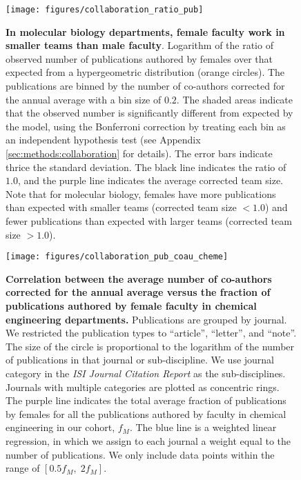 \clearpage

\begin{figure}[t]
\texttt{[image: figures/collaboration\_ratio\_pub]}
\caption[Ratio of number of publications authored by females.]{\textbf{In molecular biology departments, female faculty work in smaller teams than male faculty}. Logarithm of the ratio of observed number of publications authored by females over that expected from a hypergeometric distribution (orange circles). The publications are binned by the number of co-authors corrected for the annual average with a bin size of $0.2$. The shaded areas indicate that the observed number is significantly different from expected by the model, using the Bonferroni correction by treating each bin as an independent hypothesis test (see Appendix \ref{sec:methods:collaboration} for details). The error bars indicate thrice the standard deviation. The black line indicates the ratio of $1.0$, and the purple line indicates the average corrected team size. Note that for molecular biology, females have more publications than expected with smaller teams (corrected team size $<1.0$) and fewer publications than expected with larger teams (corrected team size $>1.0$).}
\label{fig:collaboration:ratio_pub}
\end{figure}

\clearpage

\begin{figure}[t]
\texttt{[image: figures/collaboration\_pub\_coau\_cheme]}
\caption[Average co-authors and publications in chemical engineering.]{\textbf{Correlation between the average number of co-authors corrected for the annual average versus the fraction of publications authored by female faculty in chemical engineering departments.} Publications are grouped by journal. We restricted the publication types to ``article'', ``letter'', and ``note''. The size of the circle is proportional to the logarithm of the number of publications in that journal or sub-discipline. We use journal category in the \textit{ISI Journal Citation Report} as the sub-disciplines. Journals with multiple categories are plotted as concentric rings. The purple line indicates the total average fraction of publications by females for all the publications authored by faculty in chemical engineering in our cohort, $f_M$. The blue line is a weighted linear regression, in which we assign to each journal a weight equal to the number of publications. We only include data points within the range of $[0.5f_M,\;2f_M]$.}
\label{fig:collaboration:pub_coau_cheme}
\end{figure}

